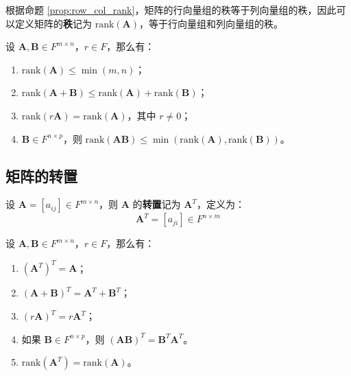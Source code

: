 \begin{definition}
    根据命题 \ref{prop:row_col_rank}，矩阵的行向量组的秩等于列向量组的秩，因此可以定义矩阵的\textbf{秩}记为 $\mathrm{rank}(\mathbf{A})$，等于行向量组和列向量组的秩。
\end{definition}

\begin{proposition}[矩阵秩的性质]
    设 $\mathbf{A},\mathbf{B} \in F^{m \times n}$，$r\in F$，那么有：
    \begin{enumerate}
        \item $\mathrm{rank}(\mathbf{A}) \leq \min(m,n)$；
        \item $\mathrm{rank}(\mathbf{A} + \mathbf{B}) \leq \mathrm{rank}(\mathbf{A}) + \mathrm{rank}(\mathbf{B})$；
        \item $\mathrm{rank}(r\mathbf{A}) = \mathrm{rank}(\mathbf{A})$，其中 $r\neq 0$；
        \item $\mathbf{B} \in F^{n \times p}$，则 $\mathrm{rank}(\mathbf{A}\mathbf{B}) \leq \min(\mathrm{rank}(\mathbf{A}),\mathrm{rank}(\mathbf{B}))$。
    \end{enumerate}
\end{proposition}

\vspace{1em}
\subsection{矩阵的转置}
\begin{definition}
    设 $\mathbf{A} = [a_{ij}] \in F^{m \times n}$，则 $\mathbf{A}$ 的\textbf{转置}记为 $\mathbf{A}^T$，定义为：
    \[
        \mathbf{A}^T = [a_{ji}] \in F^{n \times m}
    \]
    \label{def:matrix_transpose}
\end{definition}

\begin{proposition}[矩阵转置的性质]
    设 $\mathbf{A},\mathbf{B} \in F^{m \times n}$，$r\in F$，那么有：
    \begin{enumerate}
        \item $(\mathbf{A}^T)^T = \mathbf{A}$；
        \item $(\mathbf{A} + \mathbf{B})^T = \mathbf{A}^T + \mathbf{B}^T$；
        \item $(r\mathbf{A})^T = r\mathbf{A}^T$；
        \item 如果 $\mathbf{B} \in F^{n \times p}$，则 $(\mathbf{A}\mathbf{B})^T = \mathbf{B}^T\mathbf{A}^T$。
        \item $\mathrm{rank}(\mathbf{A}^T) = \mathrm{rank}(\mathbf{A})$。
    \end{enumerate}
\end{proposition}

